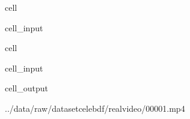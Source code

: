 \documentclass[letterpaper,10pt,brazil]{sphinxmanual}
\begin{document}
\begin{sphinxuseclass}{cell}
\begin{sphinxuseclass}{cell_input}
\begin{sphinxVerbatim}[commandchars=\\\{\}]
\end{sphinxVerbatim}

\end{sphinxuseclass}
\end{sphinxuseclass}
\begin{sphinxuseclass}{cell}
\begin{sphinxuseclass}{cell_input}
\begin{sphinxVerbatim}[commandchars=\\\{\}]
\PYG{p}{[}\PYG{p}{]}
\end{sphinxVerbatim}

\end{sphinxuseclass}
\begin{sphinxuseclass}{cell_output}
\begin{sphinxVerbatim}[commandchars=\\\{\}]
\PYGZsq{}../data/raw/dataset\PYGZus{}celebdf/real\PYGZus{}video/00001.mp4\PYGZsq{}
\end{sphinxVerbatim}

\end{sphinxuseclass}
\end{sphinxuseclass}
\end{document}
